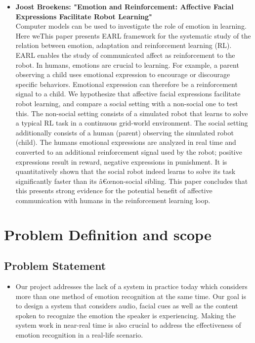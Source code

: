 \documentclass[oneside,a4paper,12pt]{report}
\begin{document}
\begin{normalsize}
\begin{itemize}
	\item \textbf{Joost Broekens:  "Emotion and Reinforcement: Affective Facial Expressions Facilitate Robot Learning"} \cite{broekens07_emotion} \\
	Computer models can be used to investigate the role of emotion in learning. Here weThis paper presents EARL framework for the systematic study of the relation between emotion, adaptation and reinforcement learning (RL). EARL enables the study of communicated affect as reinforcement to the robot. In humans, emotions are crucial to learning. For example, a parent observing a child uses emotional  expression to encourage or discourage specific behaviors. Emotional expression can therefore be a reinforcement signal to a child. We hypothesize that affective facial expressions facilitate robot learning, and compare a social setting with a non-social one to test this. The non-social setting consists of a simulated robot that learns to solve a typical RL task in a continuous grid-world environment. The social setting additionally consists of a human (parent) observing the simulated robot (child). The humans emotional expressions are analyzed in real time and converted to an additional reinforcement signal used by the robot; positive expressions result in reward, negative expressions in punishment. It is quantitatively shown that the social robot indeed learns to solve its task significantly faster than its â€œnon-social sibling. This paper concludes that this presents strong  evidence for the potential benefit of affective communication with humans in the reinforcement learning loop.
	
\end{itemize}


\chapter{Problem Definition and scope}
\flushleft
\section{Problem Statement}
\begin{itemize}
\item Our project addresses the lack of a system in practice today which considers more than one method of emotion recognition at the same time. Our goal is to design a system that considers audio, facial cues as well as the content spoken to recognize the emotion the speaker is experiencing. Making the system work in near-real time is also crucial to address the effectiveness of emotion recognition in a real-life scenario.\\
\end{itemize}
\vspace{5mm}


\end{normalsize}
\end{document}
